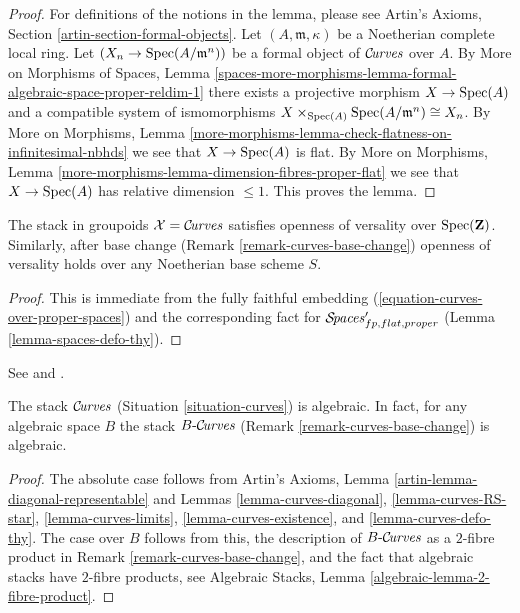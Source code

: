 \begin{proof}
For definitions of the notions in the lemma, please see
Artin's Axioms, Section \ref{artin-section-formal-objects}.
Let $(A, \mathfrak m, \kappa)$ be a Noetherian complete
local ring. Let $(X_n \to \mathop{\mathrm{Spec}}(A/\mathfrak m^n))$
be a formal object of $\mathcal{C}\!\mathit{urves}$ over $A$.
By More on Morphisms of Spaces, Lemma
\ref{spaces-more-morphisms-lemma-formal-algebraic-space-proper-reldim-1}
there exists a projective morphism $X \to \mathop{\mathrm{Spec}}(A)$
and a compatible system of ismomorphisms
$X \times_{\mathop{\mathrm{Spec}}(A)} \mathop{\mathrm{Spec}}(A/\mathfrak m^n) \cong X_n$. By
More on Morphisms, Lemma
\ref{more-morphisms-lemma-check-flatness-on-infinitesimal-nbhds}
we see that $X \to \mathop{\mathrm{Spec}}(A)$ is flat. By More on Morphisms, Lemma
\ref{more-morphisms-lemma-dimension-fibres-proper-flat}
we see that $X \to \mathop{\mathrm{Spec}}(A)$ has relative dimension $\leq 1$.
This proves the lemma.
\end{proof}

\begin{lemma}
\label{lemma-curves-defo-thy}
The stack in groupoids $\mathcal{X} = \mathcal{C}\!\mathit{urves}$
satisfies openness of versality over $\mathop{\mathrm{Spec}}(\mathbf{Z})$.
Similarly, after base change (Remark \ref{remark-curves-base-change})
openness of versality holds over any Noetherian base scheme $S$.
\end{lemma}

\begin{proof}
This is immediate from the fully faithful embedding
(\ref{equation-curves-over-proper-spaces}) and
the corresponding fact for $\mathcal{S}\!\mathit{paces}'_{fp, flat, proper}$
(Lemma \ref{lemma-spaces-defo-thy}).
\end{proof}

\begin{theorem}
\label{theorem-curves-algebraic}
\begin{reference}
See \cite[Proposition 3.3, page 8]{dJHS} and
\cite[Appendix B by Jack Hall, Theorem B.1]{Smyth}.
\end{reference}
The stack $\mathcal{C}\!\mathit{urves}$ (Situation \ref{situation-curves})
is algebraic. In fact, for any algebraic space $B$ the stack
$B\text{-}\mathcal{C}\!\mathit{urves}$ (Remark \ref{remark-curves-base-change})
is algebraic.
\end{theorem}

\begin{proof}
The absolute case follows from
Artin's Axioms, Lemma \ref{artin-lemma-diagonal-representable}
and Lemmas \ref{lemma-curves-diagonal},
\ref{lemma-curves-RS-star},
\ref{lemma-curves-limits},
\ref{lemma-curves-existence}, and
\ref{lemma-curves-defo-thy}.
The case over $B$ follows from this, the description of
$B\text{-}\mathcal{C}\!\mathit{urves}$ as a $2$-fibre product in
Remark \ref{remark-curves-base-change}, and the fact
that algebraic stacks have $2$-fibre products, see
Algebraic Stacks, Lemma \ref{algebraic-lemma-2-fibre-product}.
\end{proof}


